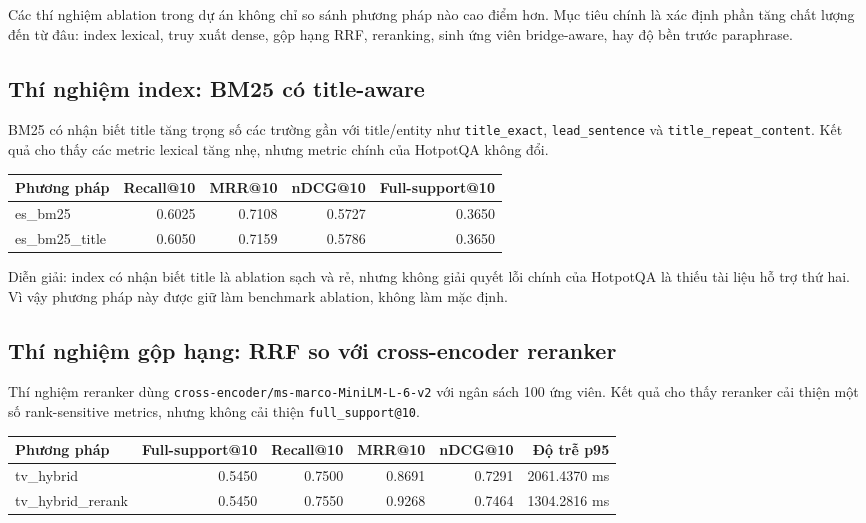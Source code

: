 \documentclass[11pt,a4paper]{article}
\newcommand{\metric}[1]{\texttt{#1}}
\begin{document}
Các thí nghiệm ablation trong dự án không chỉ so sánh phương pháp nào cao điểm hơn. Mục tiêu chính
là xác định phần tăng chất lượng đến từ đâu: index lexical, truy xuất dense, gộp hạng RRF, reranking,
sinh ứng viên bridge-aware, hay độ bền trước paraphrase.

\subsection{Thí nghiệm index: BM25 có title-aware}

BM25 có nhận biết title tăng trọng số các trường gần với title/entity như \texttt{title\_exact},
\texttt{lead\_sentence} và \texttt{title\_repeat\_content}. Kết quả cho thấy các metric lexical
tăng nhẹ, nhưng metric chính của HotpotQA không đổi.

\begin{tabularx}{\textwidth}{>{\ttfamily\raggedright\arraybackslash}p{} r r r r}
\toprule
Phương pháp & Recall@10 & MRR@10 & nDCG@10 & Full-support@10 \\
\midrule
es\_bm25 & 0.6025 & 0.7108 & 0.5727 & 0.3650 \\
es\_bm25\_title & 0.6050 & 0.7159 & 0.5786 & 0.3650 \\
\bottomrule
\end{tabularx}

Diễn giải: index có nhận biết title là ablation sạch và rẻ, nhưng không giải quyết lỗi
chính của HotpotQA là thiếu tài liệu hỗ trợ thứ hai. Vì vậy phương pháp này được giữ làm
benchmark ablation, không làm mặc định.

\subsection{Thí nghiệm gộp hạng: RRF so với cross-encoder reranker}

Thí nghiệm reranker dùng \texttt{cross-encoder/ms-marco-MiniLM-L-6-v2} với ngân sách 100 ứng viên.
Kết quả cho thấy reranker cải thiện một số rank-sensitive metrics, nhưng không cải thiện
\metric{full\_support@10}.

\begin{tabularx}{\textwidth}{>{\ttfamily\raggedright\arraybackslash}p{} r r r r r}
\toprule
Phương pháp & Full-support@10 & Recall@10 & MRR@10 & nDCG@10 & Độ trễ p95 \\
\midrule
tv\_hybrid & 0.5450 & 0.7500 & 0.8691 & 0.7291 & 2061.4370 ms \\
tv\_hybrid\_rerank & 0.5450 & 0.7550 & 0.9268 & 0.7464 & 1304.2816 ms \\
\bottomrule
\end{tabularx}
\end{document}

